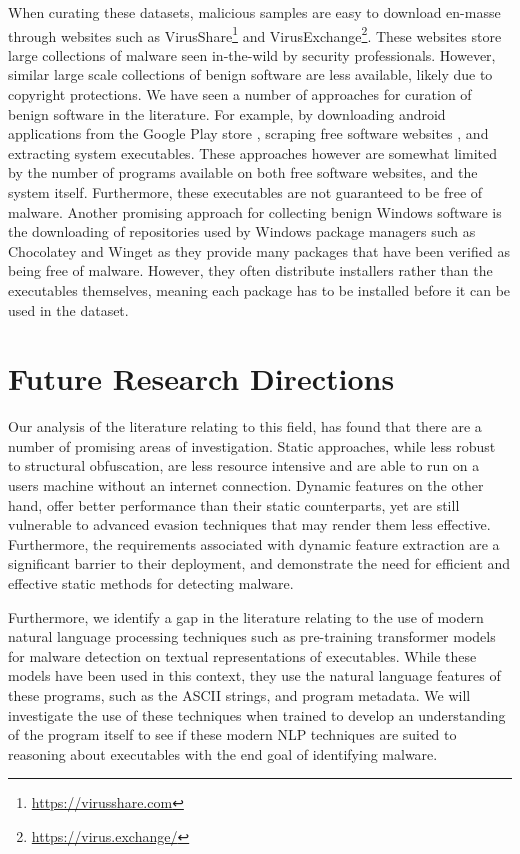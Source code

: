 \documentclass[main.tex]{subfiles}
\begin{document}
When curating these datasets, malicious samples are easy to download en-masse through websites such as VirusShare\footnote{\url{https://virusshare.com}} and VirusExchange\footnote{\url{https://virus.exchange/}}. These websites store large collections of malware seen in-the-wild by security professionals. However, similar large scale collections of benign software are less available, likely due to copyright protections. We have seen a number of approaches for curation of benign software in the literature. For example, by downloading android applications from the Google Play store \citep{karbabMalDozerAutomaticFramework2018}, scraping free software websites \citep{liDMalNetDynamicMalware2022}, and extracting system executables. These approaches however are somewhat limited by the number of programs available on both free software websites, and the system itself. Furthermore, these executables are not guaranteed to be free of malware. Another promising approach for collecting benign Windows software is the downloading of repositories used by Windows package managers such as Chocolatey and Winget as they provide many packages that have been verified as being free of malware. However, they often distribute installers rather than the executables themselves, meaning each package has to be installed before it can be used in the dataset. 


\section{Future Research Directions}

Our analysis of the literature relating to this field, has found that there are a number of promising areas of investigation. Static approaches, while less robust to structural obfuscation, are less resource intensive and are able to run on a users machine without an internet connection. Dynamic features on the other hand, offer better performance than their static counterparts, yet are still vulnerable to advanced evasion techniques that may render them less effective. Furthermore, the requirements associated with dynamic feature extraction are a significant barrier to their deployment, and demonstrate the need for efficient and effective static methods for detecting malware. 

Furthermore, we identify a gap in the literature relating to the use of modern natural language processing techniques such as pre-training transformer models for malware detection on textual representations of executables. While these models have been used in this context, they use the natural language features of these programs, such as the ASCII strings, and program metadata. We will investigate the use of these techniques when trained to develop an understanding of the program itself to see if these modern NLP techniques are suited to reasoning about executables with the end goal of identifying malware.
\end{document}
